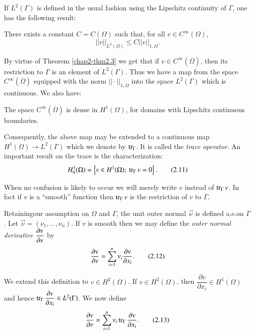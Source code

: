 If $L^{2}(\Gamma)$ is defined in the usual fashion using the Lipschitz
continuity of $\Gamma$, one has the following result:

\begin{theorem}\label{chap2-thm2.3}
There exists a constant $C=C(\Omega)$ such that, for all $v\in
C^{\infty}(\Omega)$, 
\begin{equation*}
||v||_{L^{2}(\Omega)}\leq
C||v||_{1,\Omega}.\tag{2.10}\label{chap2-eq2.10} 
\end{equation*}
\end{theorem}

By virtue of Theorem \ref{chap2-thm2.3} we get that if $v\in
C^{\infty}(\overline{\Omega})$, then its restriction to $\Gamma$ is an
element of $L^{2}(\Gamma)$. Thus we have a map from the space
$C^{\infty}(\overline{\Omega})$ equipped with the norm $||\cdot
||_{1,\Omega}$ into the space $L^{2}(\Gamma)$ which is continuous. We
also have:

\begin{theorem}\label{chap2-thm2.4}
The space $C^{\infty}(\overline{\Omega})$ is dense in $H^{1}(\Omega)$,
for domains with Lipschitz continuous boundaries.
\end{theorem}

Consequently, the above map may be extended to a continuous map
$H^{1}(\Omega)\to L^{2}(\Gamma)$ which we denote by $\operatorname{tr}_{\Gamma}$. It
is called the {\em trace operator}. An important result on the trace is
the characterization:
\begin{equation*}
H^{1}_{0}(\Omega)=\left\{v\in
H^{1}(\Omega);\ \tr_{\Gamma}v=0\right\}.\tag{2.11}\label{chap2-eq2.11} 
\end{equation*}

When no confusion is likely to occur we will merely write $v$ instead
of $\operatorname{tr}_{\Gamma}v$. In fact if $v$ is a ``smooth'' function then
$\operatorname{tr}_{\Gamma}v$ is the restriction of $v$ to $\Gamma$. 

Retaining\pageoriginale our assumption on $\Omega$ and $\Gamma$, the
unit outer normal $\overrightarrow{\nu}$ is defined a.e.\@ on
$\Gamma$. Let $\overrightarrow{\nu}=(\nu_1,\ldots,\nu_{n})$. If $v$ is
smooth then we may define the {\em outer normal derivative}
$\dfrac{\partial {\rm v}}{\partial \nu}$ by
\begin{equation*}
\frac{\partial {\rm v}}{\partial \nu}=\sum^{n}_{i=1}\nu_{i}\frac{\partial
  {\rm v}}{\partial x_{i}}.\tag{2.12}\label{chap2-eq2.12}
\end{equation*}

We extend this definition to $v\in H^{2}(\Omega)$. If $v\in
H^{2}(\Omega)$, then $\dfrac{\partial v}{\partial x_{i}}\in
H^{1}(\Omega)$ and hence $\operatorname{tr}_{\Gamma}\dfrac{\partial v}{\partial
  x_{i}}\in L^{2}(\Gamma)$. We now define
\begin{equation*}
\frac{\partial v}{\partial
  \nu}=\sum^{n}_{i=1}\nu_{i}\operatorname{tr}_{\Gamma}\frac{\partial v}{\partial
  x_{i}}.\tag{2.13}\label{chap2-eq2.13} 
\end{equation*}

